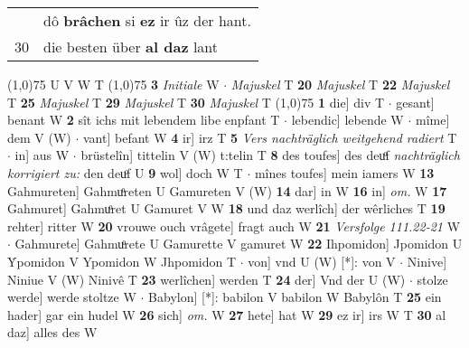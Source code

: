 \documentclass[8pt,a4paper,notitlepage]{article}
\begin{document}
\begin{table}[ht]
\begin{minipage}[t]{0.5\linewidth}
\begin{tabular}{rl}
 & dô \textbf{brâchen} si \textbf{ez} ir ûz der hant.\\ 
30 & die besten über \textbf{al daz} lant\\ 
\end{tabular}
\scriptsize
\line(1,0){75} \newline
U V W T \newline
\line(1,0){75} \newline
\textbf{3} \textit{Initiale} W   $\cdot$ \textit{Majuskel} T  \textbf{20} \textit{Majuskel} T  \textbf{22} \textit{Majuskel} T  \textbf{25} \textit{Majuskel} T  \textbf{29} \textit{Majuskel} T  \textbf{30} \textit{Majuskel} T  \newline
\line(1,0){75} \newline
\textbf{1} die] div T  $\cdot$ gesant] benant W \textbf{2} sît ichs mit lebendem libe enpfant T  $\cdot$ lebendic] lebende W  $\cdot$ mîme] dem V (W)  $\cdot$ vant] befant W \textbf{4} ir] irz T \textbf{5} \textit{Vers nachträglich weitgehend radiert} T   $\cdot$ in] aus W  $\cdot$ brüstelîn] tittelin V (W) t:telin T \textbf{8} des toufes] des deuͦf \textit{nachträglich korrigiert zu:} den deuͦf U \textbf{9} wol] doch W T  $\cdot$ mînes toufes] mein iamers W \textbf{13} Gahmureten] Gahmuͦreten U Gamureten V (W) \textbf{14} dar] in W \textbf{16} in] \textit{om.} W \textbf{17} Gahmuret] Gahmuͦret U Gamuret V W \textbf{18} und daz werlîch] der wêrliches T \textbf{19} rehter] ritter W \textbf{20} vrouwe ouch vrâgete] fragt auch W \textbf{21} \textit{Versfolge 111.22-21} W   $\cdot$ Gahmurete] Gahmuͦrete U Gamurette V gamuret W \textbf{22} Ihpomidon] Jpomidon U Ẏpomidon V Ypomidon W Jhpomidon T  $\cdot$ von] vnd U (W) [*]: von  V  $\cdot$ Ninive] Niniue V (W) Ninivê T \textbf{23} werlîchen] werden T \textbf{24} der] Vnd der U (W)  $\cdot$ stolze werde] werde stoltze W  $\cdot$ Babylon] [*]: babilon V babilon W Babylôn T \textbf{25} ein hader] gar ein hudel W \textbf{26} sich] \textit{om.} W \textbf{27} hete] hat W \textbf{29} ez ir] irs W T \textbf{30} al daz] alles des W \newline
\end{minipage}
\end{table}
\end{document}

